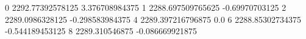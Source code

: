 0 2292.77392578125 3.376708984375
1 2288.697509765625 -0.69970703125
2 2289.0986328125 -0.298583984375
4 2289.397216796875 0.0
6 2288.85302734375 -0.544189453125
8 2289.310546875 -0.086669921875
